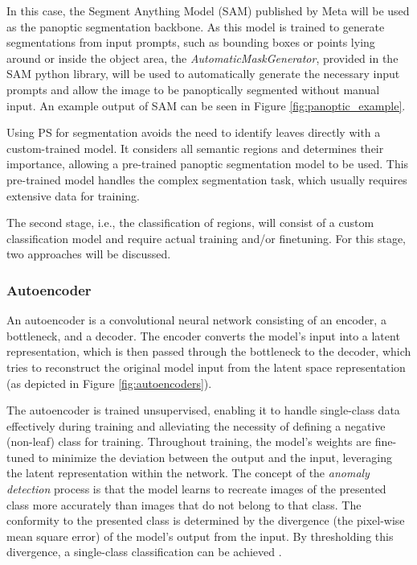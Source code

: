 \documentclass[draft,final]{vutinfth} %
\begin{document}
In this case, the Segment Anything Model (SAM) \cite{kirillov_segment_2023} published by Meta will be used as the panoptic segmentation backbone. As this model is trained to generate segmentations from input prompts, such as bounding boxes or points lying around or inside the object area, the \textit{AutomaticMaskGenerator}, provided in the SAM python library, will be used to automatically generate the necessary input prompts and allow the image to be panoptically segmented without manual input. An example output of SAM can be seen in Figure \ref{fig:panoptic_example}.

Using PS for segmentation avoids the need to identify leaves directly with a custom-trained model. It considers all semantic regions and determines their importance, allowing a pre-trained panoptic segmentation model to be used. This pre-trained model handles the complex segmentation task, which usually requires extensive data for training.

The second stage, i.e., the classification of regions, will consist of a custom classification model and require actual training and/or finetuning. For this stage, two approaches will be discussed.

\subsubsection{Autoencoder} \label{sec:method_autoencoder}
An autoencoder is a convolutional neural network consisting of an encoder, a bottleneck, and a decoder. The encoder converts the model's input into a latent representation, which is then passed through the bottleneck to the decoder, which tries to reconstruct the original model input from the latent space representation (as depicted in Figure \ref{fig:autoencoders}). 

The autoencoder is trained unsupervised, enabling it to handle single-class data effectively during training and alleviating the necessity of defining a negative (non-leaf) class for training. Throughout training, the model's weights are fine-tuned to minimize the deviation between the output and the input, leveraging the latent representation within the network. 
The concept of the \textit{anomaly detection} process is that the model learns to recreate images of the presented class more accurately than images that do not belong to that class.
The conformity to the presented class is determined by the divergence (the pixel-wise mean square error) of the model's output from the input. By thresholding this divergence, a single-class classification can be achieved \cite{bank_autoencoders_2021}.
\end{document}
